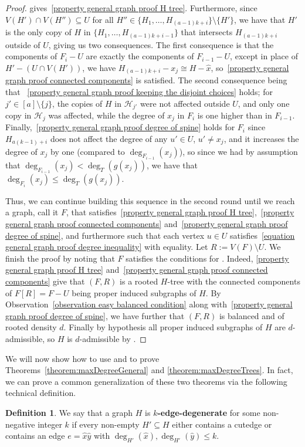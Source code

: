\documentclass[12pt,letterpaper]{article}
\theoremstyle{definition}
\newtheorem{definition}{Definition}
\newcommand{\sub}{\subseteq}
\begin{document}
\begin{proof}
		 gives~\ref{property general graph proof H tree}. Furthermore, since $V(H')\cap V(H'')\subseteq U$ for all $H''\in \{H_1,\dots,H_{(a-1)k+i}\}\setminus\{H'\}$, we have that $H'$ is the only copy of $H$ in $\{H_1,\dots,H_{(a-1)k+i-1}\}$ that intersects $H_{(a-1)k+i}$ outside of $U$, giving us two consequences. The first consequence is that the components of $F_i-U$ are exactly the components of $F_{i-1}-U$, except in place of $H'-(U\cap V(H'))$, we have $H_{(a-1)k+i}-x_j\cong H-\hat{x}$, so~\ref{property general graph proof connected components} is satisfied. The second consequence being that ~\ref{property general graph proof keeping the disjoint choices} holds; for $j'\in [a]\setminus \{j\}$, the copies of $H$ in $\mathcal{H}_{j'}$ were not affected outside $U$, and only one copy in $\mathcal{H}_j$ was affected, while the degree of $x_j$ in $F_i$ is one higher than in $F_{i-1}$. Finally,~\ref{property general graph proof degree of spine} holds for $F_i$ since $H_{a(k-1)+i}$ does not affect the degree of any $u'\in U$, $u'\neq x_j$, and it increases the degree of $x_j$ by one (compared to $\deg_{F_{i-1}}(x_j)$), so since we had by assumption that $\deg_{F_{i-1}}(x_j)<\deg_T(g(x_j))$, we have that $\deg_{F_{i}}(x_j)\leq \deg_T(g(x_j))$.
		
		Thus, we can continue building this sequence in the second round until we reach a graph, call it $F$, that satisfies~\ref{property general graph proof H tree},~\ref{property general graph proof connected components} and~\ref{property general graph proof degree of spine}, and furthermore such that each vertex $u\in U$ satisfies~\eqref{equation general graph proof degree inequality} with equality. Let $R:=V(F)\setminus U$. We finish the proof by noting that $F$ satisfies the conditions for .  Indeed, \ref{property general graph proof H tree} and~\ref{property general graph proof connected components} give that $(F,R)$ is a rooted $H$-tree with the connected components of $F[R]=F-U$ being proper induced subgraphs of $H$. By Observation~\ref{observation easy balanced condition} along with~\ref{property general graph proof degree of spine}, we have further that $(F,R)$ is balanced and of rooted density $d$.  Finally by hypothesis all proper induced subgraphs of $H$ are $d$-admissible, so $H$ is $d$-admissible by .
	\end{proof}
	
	We will now show how to use  and  to prove Theorems~\ref{theorem:maxDegreeGeneral} and \ref{theorem:maxDegreeTrees}.  In fact, we can prove a common generalization of these two theorems via the following technical definition.
	\begin{definition}
		We say that a graph $H$ is \textbf{$k$-edge-degenerate} for some non-negative integer $k$ if every non-empty $H'\sub H$ either contains a cutedge or contains an edge $e=\hat{x}\hat{y}$ with $\deg_{H'}(\hat{x}),\deg_{H'}(\hat{y})\le k$.
	\end{definition}
	
\end{document}
